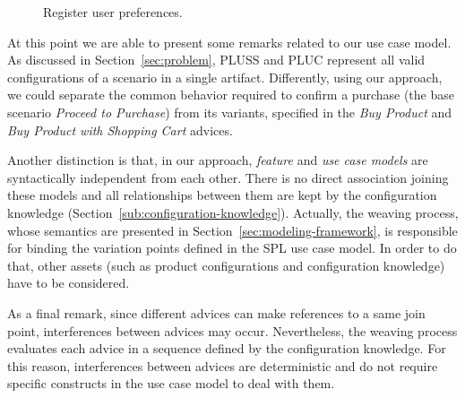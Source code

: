 \begin{figure}[h]
\caption{Register user preferences.}
\label{fig:register-preferences-flow}
\end{figure}

At this point we are able to present some remarks related to our use
case model. As discussed in Section~\ref{sec:problem}, PLUSS and PLUC represent
all valid configurations of a scenario in a single artifact. Differently, using
our approach, we could separate the common behavior required to confirm a
purchase (the base scenario \emph{Proceed to Purchase}) from its variants,
specified in the \emph{Buy Product} and \emph{Buy Product with Shopping Cart}
advices. 

Another distinction is that, in our approach, \emph{feature} and \emph{use case
models} are syntactically independent from each other. There is no direct
association joining these models and all relationships between them are kept by
the configuration knowledge (Section~\ref{sub:configuration-knowledge}).
 Actually, the weaving process, whose semantics are presented in
 Section~\ref{sec:modeling-framework}, is responsible for binding the variation
 points defined in the SPL use case model. In order to do that, other assets
 (such as product configurations and configuration knowledge) have to be
 considered. 
 
 As a final remark,
since different advices can make references to a same join point,  interferences
between advices may occur. Nevertheless, the weaving process evaluates each advice in
a sequence defined by the configuration knowledge. For this reason, interferences
between advices are deterministic and do not require specific constructs in the
use case model to deal with them.

